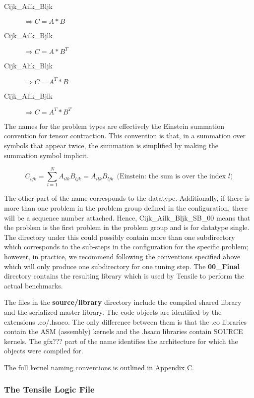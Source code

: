 \documentclass[]{article}
\begin{document}
\begin{description}
	\item[Cijk\_Ailk\_Bljk]  $ \Longrightarrow C = A * B $
	\item[Cijk\_Ailk\_Bjlk]  $ \Longrightarrow C = A * B^T $
	\item[Cijk\_Alik\_Bljk]  $ \Longrightarrow C = A^T * B $
	\item[Cijk\_Alik\_Bjlk]  $ \Longrightarrow C = A^T * B^T $
\end{description}

\noindent
The names for the problem types are effectively the Einstein summation convention for tensor contraction. This convention is that, in a summation over symbols that appear twice, the summation is simplified by making the summation symbol implicit.

\[ C_{ijk} = \sum_{l=1}^{N} A_{ilk} B_{ljk} = A_{ilk} B_{ljk}\ \ \text{(Einstein: the sum is over the index $l$)}\]

The other part of the name corresponds to the datatype. Additionally, if there is more than one problem in the problem group defined in the configuration, there will be a sequence number attached. Hence, Cijk\_Ailk\_Bljk\_SB\_00 means that the problem is the first problem in the problem group and is for datatype single. The directory under this could possibly contain more than one subdirectory which corresponds to the sub-steps in the configuration for the specific problem; however, in practice, we recommend following the conventions specified above which will only produce one subdirectory for one tuning step. The \textbf{00\_Final} directory contains the resulting library which is used by Tensile to perform the actual benchmarks.

The files in the \textbf{source/library} directory include the compiled shared library and the serialized master library. The code objects are identified by the extensions .co/.hsaco. The only difference between them is that the .co libraries contain the ASM (assembly) kernels and the .hsaco libraries contain SOURCE kernels. The gfx??? part of the name identifies the architecture for which the objects were compiled for.

The full kernel naming conventions is outlined in \hyperref[sec:appendixC]{Appendix C}.


\subsubsection{The Tensile Logic File}
\label{sec:logicFile}
\end{document}
